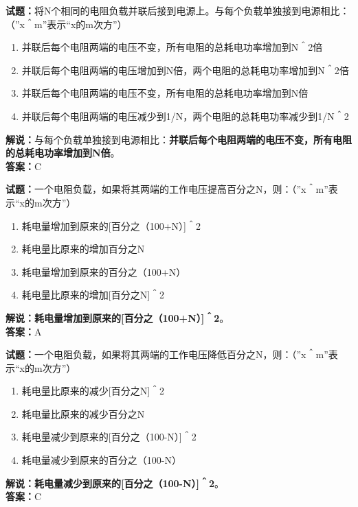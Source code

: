 \documentclass{ctexbook}
\begin{document}
\bigskip


\noindent\textbf{试题：}将N个相同的电阻负载并联后接到电源上。与每个负载单独接到电源相比：（”x＾m”表示“x的m次方”）
\begin{enumerate}[leftmargin=3em]
\item 并联后每个电阻两端的电压不变，所有电阻的总耗电功率增加到N＾2倍
\item 并联后每个电阻两端的电压增加到N倍，两个电阻的总耗电功率增加到N＾2倍
\item 并联后每个电阻两端的电压不变，所有电阻的总耗电功率增加到N倍
\item 并联后每个电阻两端的电压减少到1/N，两个电阻的总耗电功率减少到1/N＾2
\end{enumerate}
\noindent\textbf{解说：}与每个负载单独接到电源相比：\textbf{并联后每个电阻两端的电压不变，所有电阻的总耗电功率增加到N倍}。\\\noindent\textbf{答案：}C



\bigskip


\noindent\textbf{试题：}一个电阻负载，如果将其两端的工作电压提高百分之N，则：（”x＾m”表示“x的m次方”）
\begin{enumerate}[leftmargin=3em]
\item 耗电量增加到原来的[百分之（100+N）]＾2
\item 耗电量比原来的增加百分之N
\item 耗电量增加到原来的百分之（100+N）
\item 耗电量比原来的增加[百分之N]＾2
\end{enumerate}
\noindent\textbf{解说：}\textbf{耗电量增加到原来的[百分之（100+N）]＾2}。\\\noindent\textbf{答案：}A



\bigskip


\noindent\textbf{试题：}一个电阻负载，如果将其两端的工作电压降低百分之N，则：（”x＾m”表示“x的m次方”）
\begin{enumerate}[leftmargin=3em]
\item 耗电量比原来的减少[百分之N]＾2
\item 耗电量比原来的减少百分之N
\item 耗电量减少到原来的[百分之（100-N）]＾2
\item 耗电量减少到原来的百分之（100-N）
\end{enumerate}
\noindent\textbf{解说：}\textbf{耗电量减少到原来的[百分之（100-N）]＾2}。\\\noindent\textbf{答案：}C
\end{document}
